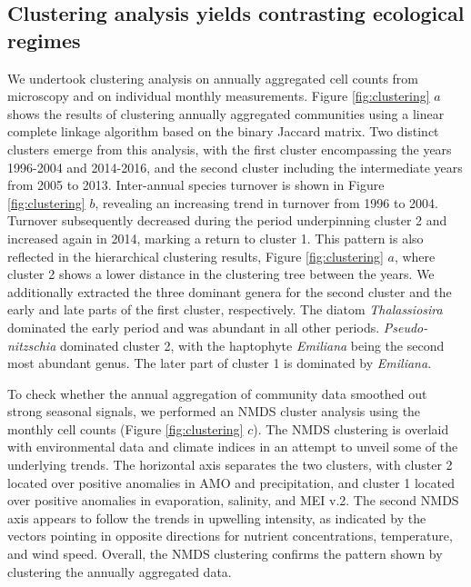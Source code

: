 \documentclass[draft]{agujournal2019}
\begin{document}
\subsection{Clustering analysis yields contrasting ecological regimes}
    We undertook clustering analysis on annually aggregated cell counts from microscopy and on individual monthly measurements. Figure \ref{fig:clustering} $a$ shows the results of clustering annually aggregated communities using a linear complete linkage algorithm based on the binary Jaccard matrix. Two distinct clusters emerge from this analysis, with the first cluster encompassing the years 1996-2004 and 2014-2016, and the second cluster including the intermediate years from 2005 to 2013. 
    Inter-annual species turnover is shown in Figure \ref{fig:clustering} $b$, revealing an increasing trend in turnover from 1996 to 2004. Turnover subsequently decreased during the period underpinning cluster 2 and increased again in 2014, marking a return to cluster 1. This pattern is also reflected in the hierarchical clustering results, Figure \ref{fig:clustering} $a$, where cluster 2 shows a lower distance in the clustering tree between the years. We additionally extracted the three dominant genera for the second cluster and the early and late parts of the first cluster, respectively. The diatom \textit{Thalassiosira} dominated the early period and was abundant in all other periods. \textit{Pseudo-nitzschia} dominated cluster 2, with the haptophyte \textit{Emiliana} being the second most abundant genus. The later part of cluster 1 is dominated by \textit{Emiliana}. 
    
    To check whether the annual aggregation of community data smoothed out strong seasonal signals, we performed an NMDS cluster analysis using the monthly cell counts (Figure \ref{fig:clustering} $c$). The NMDS clustering is overlaid with environmental data and climate indices in an attempt to unveil some of the underlying trends. The horizontal axis separates the two clusters, with cluster 2 located over positive anomalies in AMO and precipitation, and cluster 1 located over positive anomalies in evaporation, salinity, and MEI v.2. The second NMDS axis appears to follow the trends in upwelling intensity, as indicated by the vectors pointing in opposite directions for nutrient concentrations, temperature, and wind speed. Overall, the NMDS clustering confirms the pattern shown by clustering the annually aggregated data. 
    
\end{document}
